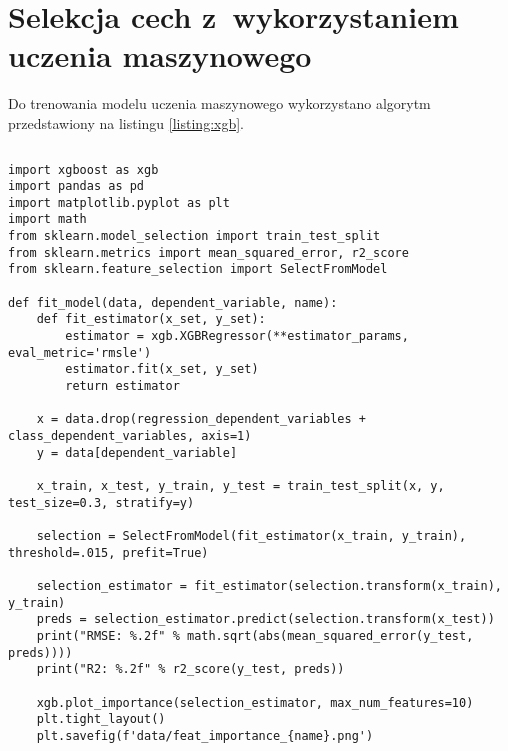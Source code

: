\section{Selekcja cech z~wykorzystaniem uczenia maszynowego}\label{sec:analysis:feature-selection-xgb}

Do trenowania modelu uczenia maszynowego wykorzystano algorytm przedstawiony na listingu \ref{listing:xgb}.


\noindent\begin{minipage}{\textwidth}
             \begin{lstlisting}[caption={Algorytm uczenia modelu regresji}, label={listing:xgb}]
             \end{lstlisting}
             \hspace{.075\textwidth}\begin{minipage}{.85\textwidth}
                                        \begin{verbatim}
import xgboost as xgb
import pandas as pd
import matplotlib.pyplot as plt
import math
from sklearn.model_selection import train_test_split
from sklearn.metrics import mean_squared_error, r2_score
from sklearn.feature_selection import SelectFromModel

def fit_model(data, dependent_variable, name):
    def fit_estimator(x_set, y_set):
        estimator = xgb.XGBRegressor(**estimator_params, eval_metric='rmsle')
        estimator.fit(x_set, y_set)
        return estimator

    x = data.drop(regression_dependent_variables + class_dependent_variables, axis=1)
    y = data[dependent_variable]

    x_train, x_test, y_train, y_test = train_test_split(x, y, test_size=0.3, stratify=y)

    selection = SelectFromModel(fit_estimator(x_train, y_train), threshold=.015, prefit=True)

    selection_estimator = fit_estimator(selection.transform(x_train), y_train)
    preds = selection_estimator.predict(selection.transform(x_test))
    print("RMSE: %.2f" % math.sqrt(abs(mean_squared_error(y_test, preds))))
    print("R2: %.2f" % r2_score(y_test, preds))

    xgb.plot_importance(selection_estimator, max_num_features=10)
    plt.tight_layout()
    plt.savefig(f'data/feat_importance_{name}.png')
                                        \end{verbatim}
             \end{minipage}

             \raggedright\source{\ownwork}
             \vspace{0.75cm}
\end{minipage}

